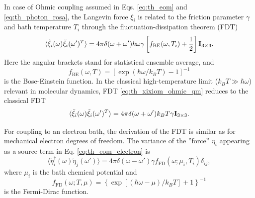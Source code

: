 In case of Ohmic coupling assumed in Eqs. \eqref{eq:th_eom} and \eqref{eq:th_photon_rosa}, the Langevin force $\xi_i$ is related to the friction parameter $\gamma$ and bath temperature $T_i$ through the fluctuation-dissipation theorem (FDT) \cite{weiss,dhar06}
\begin{equation}
 \langle \tilde \xi_i(\omega) \tilde \xi_i(\omega')^T \rangle = 4\pi \delta(\omega+\omega') \hbar \omega \gamma \left[f_{\textrm{BE}}(\omega,T_i)+ \frac{1}{2} \right] \mathbf{I}_{3\times 3}. \label{eq:th_xixiom_ohmic_qm}
\end{equation}
Here the angular brackets stand for statistical ensemble average, and 
\begin{equation}
 f_{\textrm{BE}}(\omega,T)=\left[\exp(\hbar \omega/k_BT)-1\right]^{-1}
\end{equation}
is the Bose-Einstein function. In the classical high-temperature limit ($k_B T \gg \hbar \omega$) relevant in molecular dynamics, FDT \eqref{eq:th_xixiom_ohmic_qm} reduces to the classical FDT
\begin{equation}
 \langle \tilde \xi_i(\omega) \tilde \xi_i(\omega')^T \rangle = 4\pi \delta(\omega+\omega') k_B T \gamma \mathbf{I}_{3\times 3}. \label{eq:th_xixiom_ohmic_classical}
\end{equation}


For coupling to an electron bath, the derivation of the FDT is similar as for mechanical electron degrees of freedom. The variance of the ''force'' $\eta_i$ appearing as a source term in Eq. \eqref{eq:th_eom_electron} is \cite{dhar03}
\begin{equation}
 \langle \tilde \eta_{i}^{\dagger}(\omega) \tilde \eta_{j}(\omega') \rangle = 4\pi\delta(\omega-\omega') \gamma f_{\textrm{FD}}(\omega;\mu_{i},T_{i}) \delta_{ij},
\end{equation}
where $\mu_i$ is the bath chemical potential and 
\begin{equation}
 f_{\textrm{FD}}(\omega;T,\mu)=\left\{\exp\left[(\hbar \omega-\mu)/k_BT\right]+1\right\}^{-1}
\end{equation}
is the Fermi-Dirac function.

